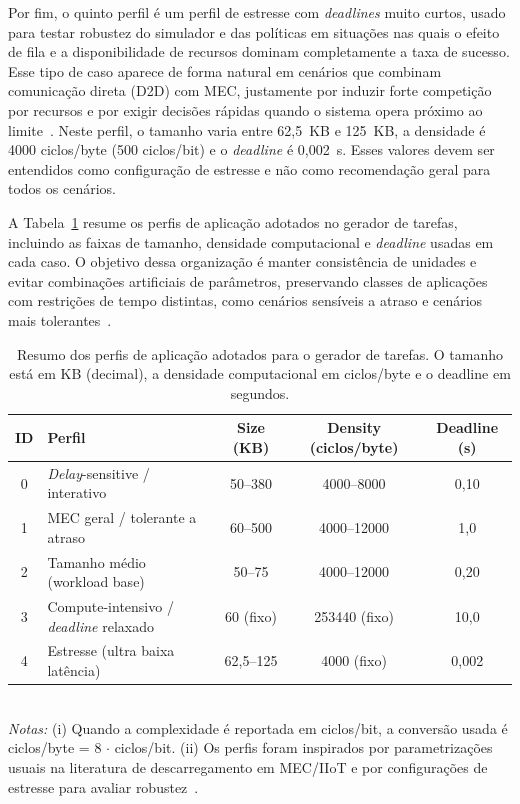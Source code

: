 Por fim, o quinto perfil é um perfil de estresse com \textit{deadlines} muito curtos, usado para testar robustez do simulador e das políticas em situações nas quais o efeito de fila e a disponibilidade de recursos dominam completamente a taxa de sucesso. Esse tipo de caso aparece de forma natural em cenários que combinam comunicação direta (\gls{D2D}) com \gls{MEC}, justamente por induzir forte competição por recursos e por exigir decisões rápidas quando o sistema opera próximo ao limite~\cite{he2019d2d_mec_twc}. Neste perfil, o tamanho varia entre 62{,}5~KB e 125~KB, a densidade é 4000 ciclos/byte (500 ciclos/bit) e o \textit{deadline} é 0{,}002~s. Esses valores devem ser entendidos como configuração de estresse e não como recomendação geral para todos os cenários.

A Tabela~\ref{tab:task-profiles-summary} resume os perfis de aplicação adotados no gerador de tarefas, incluindo as faixas de tamanho, densidade computacional e \textit{deadline} usadas em cada caso. O objetivo dessa organização é manter consistência de unidades e evitar combinações artificiais de parâmetros, preservando classes de aplicações com restrições de tempo distintas, como cenários sensíveis a atraso e cenários mais tolerantes~\cite{akbari2022drl_os_sensors,hao2021risk_sensitive_iiot_jwcn,yang2019industrial_iiot_ieee_network}.

\begin{table}[htbp]
\centering
\caption{Resumo dos perfis de aplicação adotados para o gerador de tarefas. O tamanho está em KB (decimal), a densidade computacional em ciclos/byte e o deadline em segundos.}
\label{tab:task-profiles-summary}
\footnotesize
\setlength{\tabcolsep}{6pt}
\begin{tabular}{c|p{3.6cm}|c|c|c}
\hline
\textbf{ID} & \textbf{Perfil} & \textbf{Size (KB)} & \textbf{Density (ciclos/byte)} & \textbf{Deadline (s)} \\
\hline
0 & \textit{Delay}-sensitive / interativo & 50--380 & 4000--8000 & 0{,}10 \\
\hline
1 & \gls{MEC} geral / tolerante a atraso & 60--500 & 4000--12000 & 1{,}0 \\
\hline
2 & Tamanho médio (workload base) & 50--75 & 4000--12000 & 0{,}20 \\
\hline
3 & Compute-intensivo / \textit{deadline} relaxado & 60 (fixo) & 253440 (fixo) & 10{,}0 \\
\hline
4 & Estresse (ultra baixa latência) & 62{,}5--125 & 4000 (fixo) & 0{,}002 \\
\hline
\end{tabular}
\vspace{2pt}
\\
{
    \footnotesize \textit{Notas:} (i) Quando a complexidade é reportada em ciclos/bit, a conversão usada é ciclos/byte = 8 $\cdot$ ciclos/bit. (ii) Os perfis foram inspirados por parametrizações usuais na literatura de descarregamento em \gls{MEC}/IIoT e por configurações de estresse para avaliar robustez~\cite{akbari2022drl_os_sensors,hao2021risk_sensitive_iiot_jwcn,yang2019industrial_iiot_ieee_network,he2019d2d_mec_twc}.
}
\end{table}

